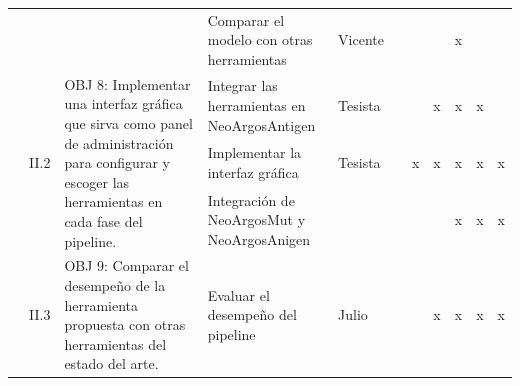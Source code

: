 \documentclass[a4paper,11pt]{article}
\begin{document}
\begin{table}[H]
\begin{tabular}{p{0.6cm}p{0.6cm}p{6cm}p{4cm}p{1cm}cccccc}
		&                       &                                                                                                                                                                                                                                                                                            & Comparar el modelo con otras herramientas                                                            & Vicente            &                       &                        & \multicolumn{1}{l}{} & x                    &                       &                        \\
		& \multirow{3}{*}{II.2} & \multirow{3}{6cm}{OBJ 8: Implementar una interfaz gráfica que sirva como panel de administración para configurar y escoger las herramientas en cada fase del pipeline.}                                                                                                                   & Integrar las herramientas en NeoArgosAntigen                                                         & Tesista            &                       &                        & x                    & x                    & \multicolumn{1}{c}{x} &                        \\
		&                       &                                                                                                                                                                                                                                                                                            & Implementar la interfaz gráfica                                                                      & Tesista            &                       & \multicolumn{1}{c}{x}  & x                    & x                    & \multicolumn{1}{c}{x} & \multicolumn{1}{c}{x}  \\
		&                       &                                                                                                                                                                                                                                                                                            & Integración de NeoArgosMut y NeoArgosAnigen                                                          &                    &                       &                        & \multicolumn{1}{l}{} & x                    & \multicolumn{1}{c}{x} & \multicolumn{1}{c}{x}  \\
		& \multirow{4}{*}{II.3} & \multirow{4}{6cm}{OBJ 9: Comparar el desempeño de la herramienta propuesta con otras herramientas del estado del arte.}                                                                                                                                                                   & Evaluar el desempeño del pipeline                                                                    & Julio              &                       &                        & x                    & x                    & \multicolumn{1}{c}{x} & \multicolumn{1}{c}{x}  \\

\end{tabular}
\end{table}
\end{document}

